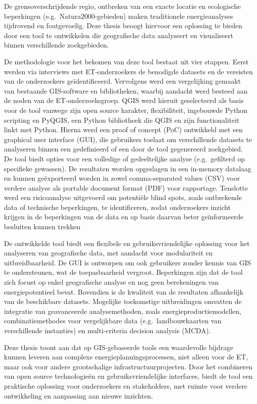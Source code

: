 De grensoverschrijdende regio, ontbreken van een exacte locatie en ecologische beperkingen (e.g.\ Natura2000-gebieden) maken traditionele energieanalyses tijdrovend en foutgevoelig. Deze thesis beoogt hiervoor een oplossing te bieden door een tool te ontwikkelen die geografische data analyseert en visualiseert binnen verschillende zoekgebieden.\medskip

De methodologie voor het bekomen van deze tool bestaat uit vier stappen. Eerst werden via interviews met ET-onderzoekers de benodigde datasets en de vereisten van de onderzoekers geïdentificeerd. Vervolgens werd een vergelijking gemaakt van bestaande GIS-software en bibliotheken, waarbij aandacht werd besteed aan de noden van de ET-onderzoeksgroep. 
QGIS werd hieruit geselecteerd als basis voor de tool vanwege zijn open source karakter, flexibiliteit, ingebouwde Python scripting en PyQGIS, een Python bibliotheek die QGIS en zijn functionaliteit linkt met Python. Hierna werd een proof of concept (PoC) ontwikkeld met een graphical user interface (GUI), die gebruikers toelaat om verschillende datasets te analyseren binnen een gedefinieerd of een door de tool gegenereerd zoekgebied. 
De tool biedt opties voor een volledige of gedeeltelijke analyse (e.g.\ gefilterd op specifieke gewassen). 
De resultaten worden opgeslagen in een in-memory datalaag en kunnen geëxporteerd worden in zowel comma-separated values (CSV) voor verdere analyse als portable document format (PDF) voor rapportage. 
Tenslotte werd een risicoanalyse uitgevoerd om potentiële blind spots, zoals ontbrekende data of technische beperkingen, te identificeren, zodat onderzoekers inzicht krijgen in de beperkingen van de data en op basis daarvan beter geïnformeerde besluiten kunnen trekken\medskip

De ontwikkelde tool biedt een flexibele en gebruiksvriendelijke oplossing voor het analyseren van geografische data, met aandacht voor modulariteit en uitbreidbaarheid. De GUI is ontworpen om ook gebruikers zonder kennis van GIS te ondersteunen, wat de toepasbaarheid vergroot. Beperkingen zijn dat de tool zich focust op enkel geografische analyse en nog geen berekeningen van energiepotentieel bevat. Bovendien is de kwaliteit van de resultaten afhankelijk van de beschikbare datasets. Mogelijke toekomstige uitbreidingen omvatten de integratie van geavanceerde analysemethoden, zoals energieproductiemodellen, combinatiemethodes voor vergelijkbare data (e.g.\ landbouwkaarten van verschillende instanties) en multi-criteria decision analysis (MCDA).\medskip

Deze thesis toont aan dat op GIS-gebaseerde tools een waardevolle bijdrage kunnen leveren aan complexe energieplanningsprocessen, niet alleen voor de ET, maar ook voor andere grootschalige infrastructuurprojecten. Door het combineren van open source technologieën en gebruiksvriendelijke interfaces, biedt de tool een praktische oplossing voor onderzoekers en stakeholders, met ruimte voor verdere ontwikkeling en aanpassing aan nieuwe inzichten.
